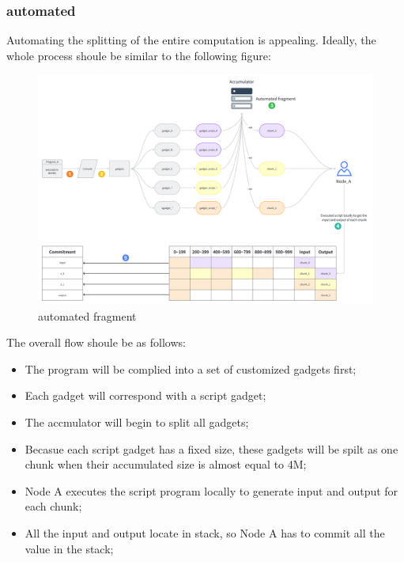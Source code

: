 \subsubsection{automated}

Automating the splitting of the entire computation is appealing. Ideally, the whole process shoule be similar to the following figure:

\begin{figure}[ht] 
    \centering  
    \includegraphics[width=0.85\columnwidth]{images/automated-fragment.png} 
    \caption{automated fragment}
    \label{fig:automated-fragment}
\end{figure}

The overall flow shoule be as follows:
\begin{itemize}
    \item The program will be complied into a set of customized gadgets first;
    \item Each gadget will correspond with a script gadget;
    \item The accmulator will begin to split all gadgets;
    \item Becasue each script gadget has a fixed size, these gadgets will be spilt as one chunk when their accumulated size is almost equal to 4M;
    \item Node A executes the script program locally to generate input and output for each chunk;
    \item All the input and output locate in stack, so Node A has to commit all the value in the stack;
\end{itemize}

